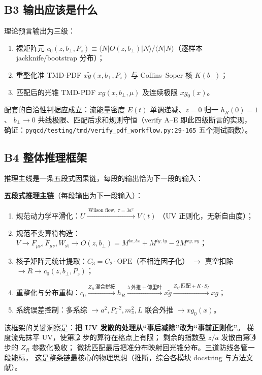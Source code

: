 \documentclass[UTF8]{ctexart}
\begin{document}
\subsection{B3 输出应该是什么}
理论预言输出为三级：
\begin{enumerate}
\item 裸矩阵元 $c_0(z,b_\perp,P_z)\equiv\langle N|O(z,b_\perp)|N\rangle/
\langle N|N\rangle$（逐样本 jackknife/bootstrap 分布）；
\item 重整化准 TMD-PDF $x\tilde g(x,b_\perp,P_z)$ 与 Collins--Soper 核 $K(b_\perp)$；
\item 匹配后的光锥 TMD-PDF $xg(x,b_\perp,\mu)$ 及连续极限 $xg_0(x)$。
\end{enumerate}
配套的自洽性判据应成立：流能量密度 $E(t)$ 单调递减、$z=0$ 归一 $h_R(0)=1$、
$b_\perp\to0$ 共线极限、匹配后求和规则守恒（verify A--E 即此四级断言的实现，
确证：\texttt{\nolinkurl{pyqcd/testing/tmd/verify_pdf_workflow.py:29-165}} 五个测试函数）。

\subsection{B4 整体推理框架}
推理主线是一条五段式因果链，每段的输出恰为下一段的输入：

\begin{keybox}
\textbf{五段式推理主链}（每段输出为下一段输入）：
\begin{enumerate}
\item 规范动力学平滑化：$U\xrightarrow{\;\text{Wilson flow},\;\tau=3a^2\;}V(t)$
（UV 正则化，无新自由度）；
\item 规范不变算符构造：$V\to F_{\mu\nu},\tilde F_{\mu\nu},W_{\mathrm{st}}
\to O(z,b_\perp)=M^{tx;tx}+M^{ty;ty}-2M^{xy;xy}$；
\item 核子矩阵元统计提取：$C_3=C_2\cdot\mathrm{OPE}$（不相连因子化）
$\to$ 真空扣除 $\to R\to c_0(z,b_\perp,P_z)$；
\item 重整化与分布重构：$c_0\xrightarrow{Z_R\,\text{混合拼接}}h_R
\xrightarrow{\lambda\,\text{外推}+\text{傅里叶}}x\tilde g
\xrightarrow{Z_{ij}\,\text{匹配}+K\cdot S_I}xg$；
\item 系统误差控制：多系综 $\to a^2,P_z^{-2},m_\pi^2,L$ 联合外推 $\to xg_0(x)$。
\end{enumerate}
\end{keybox}

该框架的关键洞察是：\textbf{把 UV 发散的处理从``事后减除''改为``事前正则化''}。
梯度流先抹平 UV，使第 \textcircled{\scriptsize 2} 步的算符在格点上有限；
剩余的指数型 $z/a$ 发散由第 \textcircled{\scriptsize 4} 步的 $Z_R$ 参数化吸收；
微扰匹配最后把准分布映射回光锥分布。三道防线各管一段能标，
这是整条链最核心的物理思想（推断，综合各模块 docstring 与方法文献）。
\end{document}
